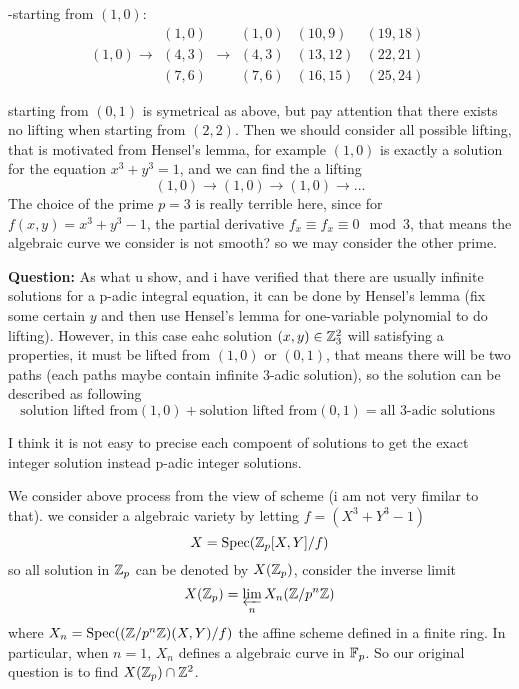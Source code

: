     -starting from \((1,0)\):
    \[(1,0) \rightarrow \begin{matrix}
        (1,0) \\
        (4,3) \\
        (7,6)
    \end{matrix} \rightarrow
    \begin{matrix}
        (1,0) & (10,9) & (19,18) \\
        (4,3) & (13,12) & (22,21) \\
        (7,6) & (16,15) & (25,24)
    \end{matrix}\]

    starting from \((0,1)\) is symetrical as above, but pay attention that there exists no lifting when starting from \((2,2)\). Then we should consider all possible lifting, that is motivated from Hensel's lemma, for example \((1,0)\) is exactly a solution for the equation \(x^3+y^3=1\), and we can find the a lifting
    \[(1,0) \rightarrow (1,0) \rightarrow (1,0) \rightarrow ...\]
    The choice of the prime \(p=3\) is really terrible here, since for \(f(x,y) = x^3+y^3-1\), the partial derivative \(f_x \equiv f_x \equiv 0 \mod 3\), that means the algebraic curve we consider is not smooth? so we may consider the other prime.

    \textbf{Question:}
    As what u show, and i have verified that there are usually infinite solutions for a p-adic integral equation, it can be done by Hensel's lemma (fix some certain \(y\) and then use Hensel's lemma for one-variable polynomial to do lifting). However, in this case eahc solution \((x,y) \in \mathbb{Z}_3^2\) will satisfying a properties, it must be lifted from \((1,0)\) or \((0,1)\), that means there will be two paths (each paths maybe contain infinite 3-adic solution), so the solution can be described as following
    \[\text{solution lifted from} (1,0) + \text{solution lifted from} (0,1) = \text{all 3-adic solutions
    }\]
    
    I think it is not easy to precise each compoent of solutions to get the exact integer solution instead p-adic integer solutions.

    We consider above process from the view of scheme (i am not very fimilar to that).
    we consider a algebraic variety by letting \(f = (X^3+Y^3-1)\)
    \[X = \text{Spec}(\mathbb{Z}_p[X,Y]/f)\]
    so all solution in \(\mathbb{Z}_p\) can be denoted by \(X(\mathbb{Z}_p)\), consider the inverse limit
    \[X(\mathbb{Z}_p) = \varprojlim_{n} X_n(\mathbb{Z}/p^n\mathbb{Z})\]
    where \(X_n = \text{Spec}((\mathbb{Z}/p^n\mathbb{Z})(X,Y)/f)\) the affine scheme defined in a finite ring. In particular, when \(n=1\), \(X_n\) defines a algebraic curve in \(\mathbb{F}_p\). So our original question is to find \(X(\mathbb{Z}_p) \cap \mathbb{Z}^2\).
